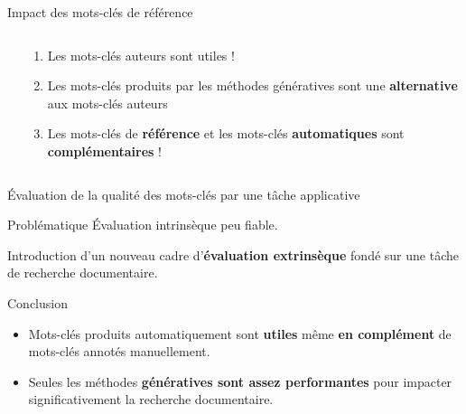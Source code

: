 \begin{frame}{Impact des mots-clés de référence}
    \begin{columns}
\begin{column}{.5\textwidth}

\end{column}
\begin{column}{.49\textwidth}
    \addtolength{\leftmargini}{\labelsep -.75cm}
    \begin{enumerate}
    \item<1-> Les mots-clés auteurs sont utiles !
    \item<3-> Les mots-clés produits par les méthodes génératives sont une \textbf<2-3>{alternative} aux mots-clés auteurs
    \item<5-> Les mots-clés de \textbf<5>{référence} et les mots-clés \textbf<5>{automatiques} sont \textbf<5>{complémentaires} !
    \end{enumerate}
\end{column}
    \end{columns}
\end{frame}

\begin{frame}{\'Evaluation de la qualité des mots-clés par une tâche applicative}
    \begin{block}{Problématique}
    \'Evaluation intrinsèque peu fiable.
    \end{block}

    Introduction d'un nouveau cadre d'\textbf{évaluation extrinsèque} fondé sur une tâche de recherche documentaire.

    \begin{block}{Conclusion}
    \begin{itemize}
        \item Mots-clés produits automatiquement sont \textbf{utiles} même \textbf{en complément} de mots-clés annotés manuellement. %
        \item Seules les méthodes \textbf{génératives sont assez performantes} pour impacter significativement la recherche documentaire.
    \end{itemize}
    \end{block}

\end{frame}